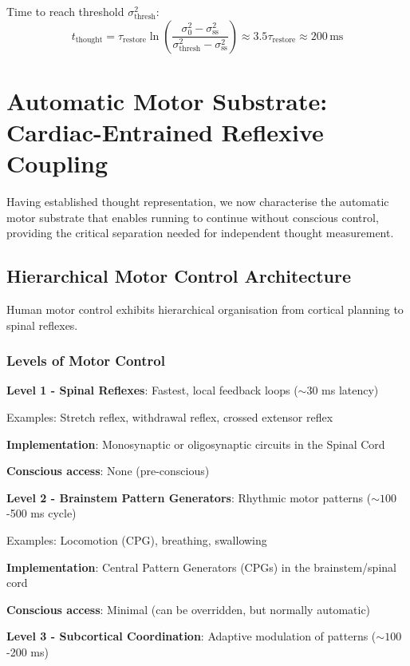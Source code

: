 \documentclass[11pt,onecolumn]{article}
\begin{document}
Time to reach threshold $\sigma_{\text{thresh}}^2$:
\begin{equation}
t_{\text{thought}} = \tau_{\text{restore}} \ln\left(\frac{\sigma_0^2 - \sigma_{\text{ss}}^2}{\sigma_{\text{thresh}}^2 - \sigma_{\text{ss}}^2}\right) \approx 3.5\tau_{\text{restore}} \approx 200\,\text{ms}
\end{equation}

\section{Automatic Motor Substrate: Cardiac-Entrained Reflexive Coupling}

Having established thought representation, we now characterise the automatic motor substrate that enables running to continue without conscious control, providing the critical separation needed for independent thought measurement.

\subsection{Hierarchical Motor Control Architecture}

Human motor control exhibits hierarchical organisation from cortical planning to spinal reflexes.

\subsubsection{Levels of Motor Control}

\textbf{Level 1 - Spinal Reflexes}: Fastest, local feedback loops ($\sim 30$ ms latency)

Examples: Stretch reflex, withdrawal reflex, crossed extensor reflex

\textbf{Implementation}: Monosynaptic or oligosynaptic circuits in the Spinal Cord

\textbf{Conscious access}: None (pre-conscious)

\textbf{Level 2 - Brainstem Pattern Generators}: Rhythmic motor patterns ($\sim 100$-500 ms cycle)

Examples: Locomotion (CPG), breathing, swallowing

\textbf{Implementation}: Central Pattern Generators (CPGs) in the brainstem/spinal cord

\textbf{Conscious access}: Minimal (can be overridden, but normally automatic)

\textbf{Level 3 - Subcortical Coordination}: Adaptive modulation of patterns ($\sim 100$-200 ms)
\end{document}
